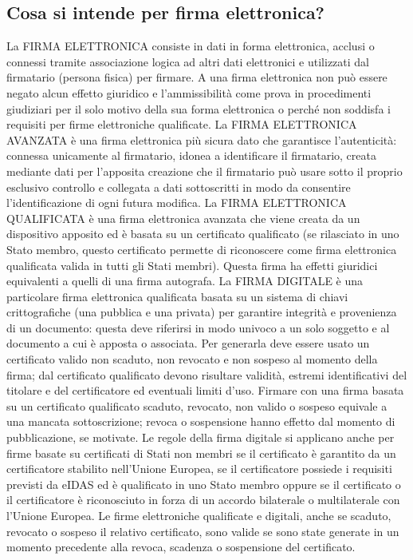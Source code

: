 \subsection{Cosa si intende per firma elettronica?}
La FIRMA ELETTRONICA consiste in dati in forma elettronica, acclusi o connessi tramite associazione
logica ad altri dati elettronici e utilizzati dal firmatario (persona fisica) per firmare.
A una firma elettronica non può essere negato alcun effetto giuridico e l’ammissibilità
come prova in procedimenti giudiziari per il solo motivo della sua forma elettronica
o perché non soddisfa i requisiti per firme elettroniche qualificate.
\newline
La FIRMA ELETTRONICA AVANZATA è una firma elettronica più sicura dato che garantisce l’autenticità:
connessa unicamente al firmatario, idonea a identificare il firmatario,
creata mediante dati per l’apposita creazione che il firmatario può usare sotto
il proprio esclusivo controllo e collegata a dati sottoscritti in modo da
consentire l’identificazione di ogni futura modifica.
\newline
La FIRMA ELETTRONICA QUALIFICATA è una firma elettronica avanzata che viene
creata da un dispositivo apposito ed è basata su un certificato qualificato
(se rilasciato in uno Stato membro, questo certificato permette di riconoscere
come firma elettronica qualificata valida in tutti gli Stati membri).
Questa firma ha effetti giuridici equivalenti a quelli di una firma autografa.
\newline
La FIRMA DIGITALE è una particolare firma elettronica qualificata basata
su un sistema di chiavi crittografiche (una pubblica e una privata) per garantire
integrità e provenienza di un documento: questa deve riferirsi in modo univoco
a un solo soggetto e al documento a cui è apposta o associata.
Per generarla deve essere usato un certificato valido non scaduto, non revocato
e non sospeso al momento della firma; dal certificato qualificato devono risultare validità,
estremi identificativi del titolare e del certificatore ed eventuali limiti d’uso.
Firmare con una firma basata su un certificato qualificato scaduto,
revocato, non valido o sospeso equivale a una mancata sottoscrizione;
revoca o sospensione hanno effetto dal momento di pubblicazione, se motivate.
Le regole della firma digitale si applicano anche per firme basate su certificati
di Stati non membri se il certificato è garantito da un certificatore stabilito
nell’Unione Europea, se il certificatore possiede i requisiti previsti da eIDAS
ed è qualificato in uno Stato membro oppure se il certificato o il certificatore
è riconosciuto in forza di un accordo bilaterale o multilaterale con l’Unione Europea.
Le firme elettroniche qualificate e digitali, anche se scaduto, revocato o sospeso il
relativo certificato, sono valide se sono state generate in un momento precedente alla
revoca, scadenza o sospensione del certificato.
